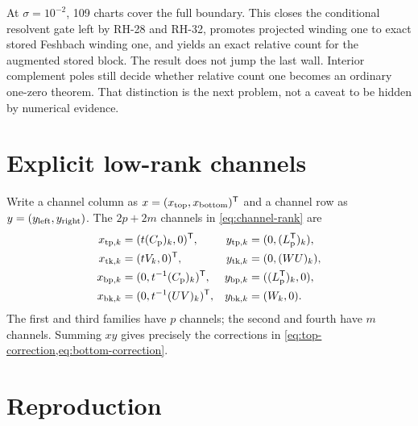 \documentclass[11pt]{article}
\theoremstyle{definition}
\theoremstyle{remark}
\begin{document}
At $\sigma=10^{-2}$, 109 charts cover the full boundary.  This closes the
conditional resolvent gate left by RH-28 and RH-32, promotes projected
winding one to exact stored Feshbach winding one, and yields an exact
relative count for the augmented stored block.  The result does not jump the
last wall.  Interior complement poles still decide whether relative count
one becomes an ordinary one-zero theorem.  That distinction is the next
problem, not a caveat to be hidden by numerical evidence.

\appendix

\section{Explicit low-rank channels}
\label{app:channels}

Write a channel column as
$x=(x_{\rm top},x_{\rm bottom})^{\mathsf T}$ and a channel row as
$y=(y_{\rm left},y_{\rm right})$.  The $2p+2m$ channels in
\cref{eq:channel-rank} are
\begin{align*}
 x_{{\rm tp},k}&=(t(C_{\rm p})_k,0)^{\mathsf T},
 &y_{{\rm tp},k}&=(0,(L_{\rm p}^{\mathsf T})_k),\\
 x_{{\rm tk},k}&=(tV_k,0)^{\mathsf T},
 &y_{{\rm tk},k}&=(0,(WU)_k),\\
 x_{{\rm bp},k}&=(0,t^{-1}(C_{\rm p})_k)^{\mathsf T},
 &y_{{\rm bp},k}&=((L_{\rm p}^{\mathsf T})_k,0),\\
 x_{{\rm bk},k}&=(0,t^{-1}(UV)_k)^{\mathsf T},
 &y_{{\rm bk},k}&=(W_k,0).
\end{align*}
The first and third families have $p$ channels; the second and fourth have
$m$ channels.  Summing $xy$ gives precisely the corrections in
\cref{eq:top-correction,eq:bottom-correction}.

\section{Reproduction}
\label{app:reproduction}
\end{document}
